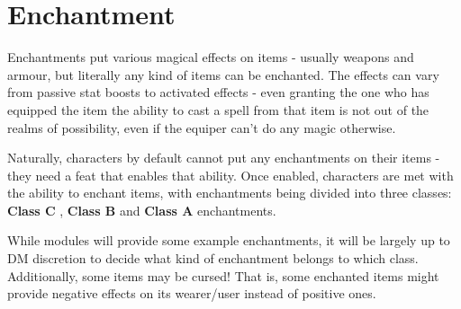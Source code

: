 \section{Enchantment}
Enchantments put various magical effects on items - usually weapons and armour, but literally any kind of items can be enchanted. The effects can vary from passive stat boosts to activated effects - even granting the one who has equipped the item the ability to cast a spell from that item is not out of the realms of possibility, even if the equiper can't do any magic otherwise.

Naturally, characters by default cannot put any enchantments on their items - they need a feat that enables that ability. Once enabled, characters are met with the ability to enchant items, with enchantments being divided into three classes: \textbf{Class C} , \textbf{Class B}  and \textbf{Class A}  enchantments.

While modules will provide some example enchantments, it will be largely up to DM discretion to decide what kind of enchantment belongs to which class. Additionally, some items may be cursed! That is, some enchanted items might provide negative effects on its wearer/user instead of positive ones.
